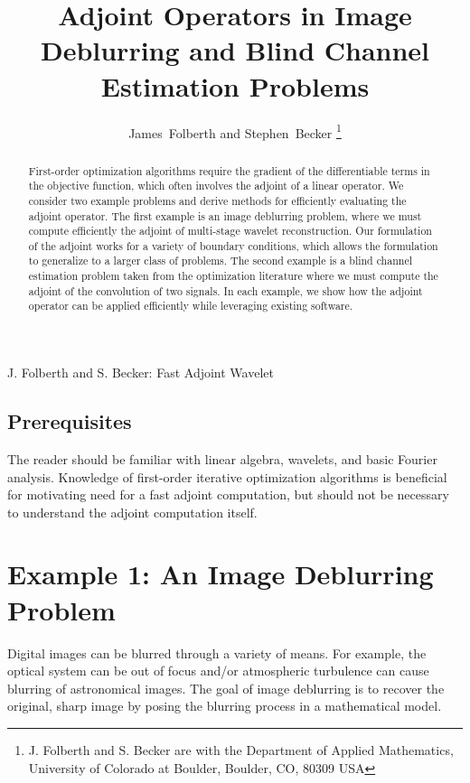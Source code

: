 \documentclass[journal]{IEEEtran}
\begin{document}
\title{Adjoint Operators in Image Deblurring and Blind Channel Estimation Problems}
\author{James~Folberth and 
        Stephen~Becker%
\thanks{J. Folberth and S. Becker are with the Department
of Applied Mathematics, University of Colorado at Boulder,
Boulder, CO, 80309 USA}}

%
{J. Folberth and S. Becker: Fast Adjoint Wavelet}

\maketitle

\begin{abstract}
   First-order optimization algorithms require the gradient of the differentiable terms in the objective function, which often involves the adjoint of a linear operator.  We consider two example problems and derive methods for efficiently evaluating the adjoint operator.  The first example is an image deblurring problem, where we must compute efficiently the adjoint of multi-stage wavelet reconstruction.  Our formulation of the adjoint works for a variety of boundary conditions, which allows the formulation to generalize to a larger class of problems.  The second example is a blind channel estimation problem taken from the optimization literature where we must compute the adjoint of the convolution of two signals.  In each example, we show how the adjoint operator can be applied efficiently while leveraging existing software.
\end{abstract}

\subsection*{Prerequisites}
The reader should be familiar with linear algebra, wavelets, and basic Fourier analysis.  Knowledge of first-order iterative optimization algorithms is beneficial for motivating need for a fast adjoint computation, but should not be necessary to understand the adjoint computation itself.\\


\section{Example 1: An Image Deblurring Problem}
Digital images can be blurred through a variety of means.  For example, the optical system can be out of focus and/or atmospheric turbulence can cause blurring of astronomical images.  The goal of image deblurring is to recover the original, sharp image by posing the blurring process in a mathematical model.\\
\end{document}
